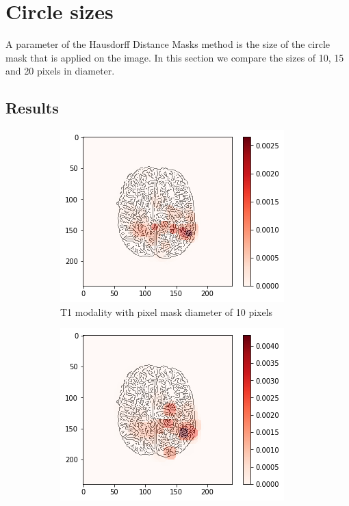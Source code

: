 \clearpage

\section{Circle sizes}
\label{hdm_circle_size}
A parameter of the Hausdorff Distance Masks method is the size of the circle mask that is applied on the image. In this section we compare the sizes of 10, 15 and 20 pixels in diameter.

\subsection{Results}

\begin{figure}[H]
    \centering
    \begin{subfigure}{.32\textwidth}
        \centering
        \includegraphics[width=\linewidth]{chapters/06_hdm/b_Brats18_TCIA08_242_1_L2/23.png}
        \caption{T1 modality with pixel mask diameter of 10 pixels}
    \end{subfigure}\hfill%
    \begin{subfigure}{.32\textwidth}
        \centering
        \includegraphics[width=\linewidth]{chapters/06_hdm/circle15/3.png}

\end{subfigure}
\end{figure}
